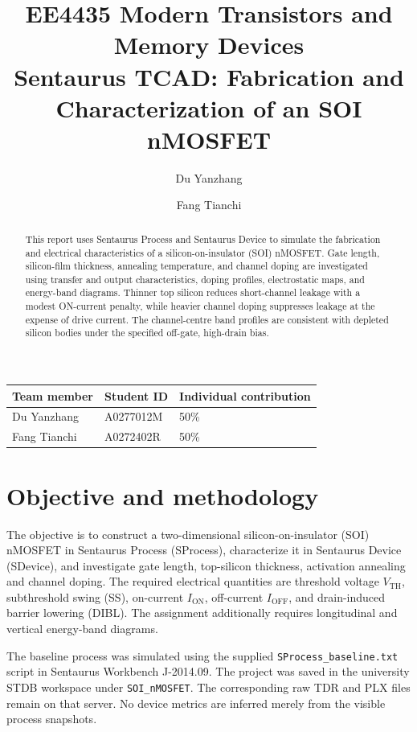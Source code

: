 \documentclass[11pt,a4paper]{article}
\title{\textbf{EE4435 Modern Transistors and Memory Devices}\\Sentaurus TCAD: Fabrication and Characterization of an SOI nMOSFET}
\author{Du Yanzhang \and Fang Tianchi}
\date{}
\begin{document}
\maketitle
\begin{center}
\begin{tabular}{@{}lll@{}}
\toprule
Team member & Student ID & Individual contribution\\
\midrule
Du Yanzhang & A0277012M & 50\%\\
Fang Tianchi & A0272402R & 50\%\\
\bottomrule
\end{tabular}
\end{center}

\begin{abstract}
This report uses Sentaurus Process and Sentaurus Device to simulate
the fabrication and electrical characteristics of a silicon-on-insulator
(SOI) nMOSFET. Gate length, silicon-film thickness, annealing
temperature, and channel doping are investigated using transfer
and output characteristics, doping profiles, electrostatic maps,
and energy-band diagrams. Thinner top silicon reduces short-channel
leakage with a modest ON-current penalty, while heavier channel
doping suppresses leakage at the expense of drive current.
The channel-centre band profiles are consistent with depleted
silicon bodies under the specified off-gate, high-drain bias.
\end{abstract}

\clearpage
\tableofcontents
\clearpage

\section{Objective and methodology}
The objective is to construct a two-dimensional silicon-on-insulator (SOI) nMOSFET in Sentaurus Process (SProcess), characterize it in Sentaurus Device (SDevice), and investigate gate length, top-silicon thickness, activation annealing and channel doping. The required electrical quantities are threshold voltage $V_{\mathrm{TH}}$, subthreshold swing (SS), on-current $I_{\mathrm{ON}}$, off-current $I_{\mathrm{OFF}}$, and drain-induced barrier lowering (DIBL). The assignment additionally requires longitudinal and vertical energy-band diagrams.

The baseline process was simulated using the supplied \texttt{SProcess\_baseline.txt} script in Sentaurus Workbench J-2014.09. The project was saved in the university STDB workspace under \texttt{SOI\_nMOSFET}. The corresponding raw TDR and PLX files remain on that server.
No device metrics are inferred merely from the visible process snapshots.
\end{document}
